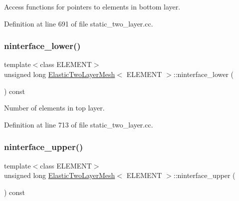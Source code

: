 Access functions for pointers to elements in bottom layer. 



Definition at line 691 of file static\+\_\+two\+\_\+layer.\+cc.

\mbox{\label{classElasticTwoLayerMesh_ae5db5553497593905fd227bfc5b34b50}} 
\subsubsection{\texorpdfstring{ninterface\+\_\+lower()}{ninterface\_lower()}}
{\footnotesize\ttfamily template$<$class E\+L\+E\+M\+E\+NT$>$ \\
unsigned long \hyperlink{classElasticTwoLayerMesh}{Elastic\+Two\+Layer\+Mesh}$<$ E\+L\+E\+M\+E\+NT $>$\+::ninterface\+\_\+lower (\begin{DoxyParamCaption}{ }\end{DoxyParamCaption}) const\hspace{0.3cm}{\ttfamily [inline]}}



Number of elements in top layer. 



Definition at line 713 of file static\+\_\+two\+\_\+layer.\+cc.

\mbox{\label{classElasticTwoLayerMesh_a6e813329601844d3d900d78a60892134}} 
\subsubsection{\texorpdfstring{ninterface\+\_\+upper()}{ninterface\_upper()}}
{\footnotesize\ttfamily template$<$class E\+L\+E\+M\+E\+NT$>$ \\
unsigned long \hyperlink{classElasticTwoLayerMesh}{Elastic\+Two\+Layer\+Mesh}$<$ E\+L\+E\+M\+E\+NT $>$\+::ninterface\+\_\+upper (\begin{DoxyParamCaption}{ }\end{DoxyParamCaption}) const\hspace{0.3cm}{\ttfamily [inline]}}



